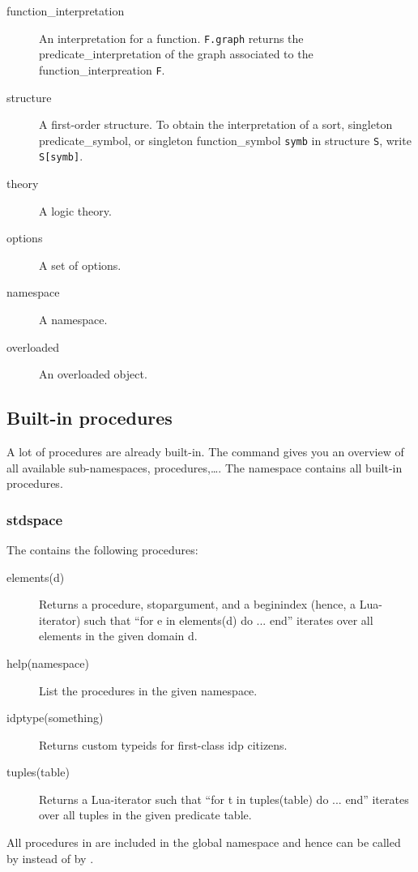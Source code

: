 \begin{description}
	\item[function\_interpretation] An interpretation for a function. {\tt F.graph} returns the predicate\_interpretation of the graph associated to the function\_interpreation {\tt F}. %
	\item[structure] A first-order structure. To obtain the interpretation of a sort, singleton predicate\_symbol, or singleton function\_symbol {\tt symb} in structure {\tt S}, write {\tt S[symb]}.
	\item[theory] A logic theory.
	\item[options] A set of options.
	\item[namespace] A namespace.
	\item[overloaded] An overloaded object.
\end{description}


\subsection{Built-in procedures}

A lot of procedures are already built-in. The command  gives you an overview of all available sub-namespaces, procedures,\ldots. The  namespace contains all built-in procedures.
\subsubsection{stdspace}
The  contains the following procedures:
\begin{description}
\item[elements(d)]
		Returns a procedure, stopargument, and a beginindex (hence, a Lua-iterator) such that
			``for e in elements(d) do ... end'' 
		iterates over all elements in the given domain d.
	\item[help(namespace)]
 		List the procedures in the given namespace.
 \item[idptype(something)]
 		Returns custom typeids for first-class idp citizens.
 		\item[tuples(table)]
 		Returns a Lua-iterator such that
 		``for t in tuples(table) do ... end''
 		iterates over all tuples in the given predicate table.
\end{description}
All procedures in  are included in the global namespace and hence can be called by  instead of by .

